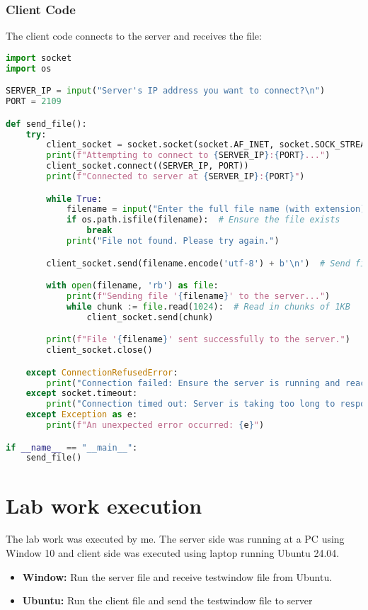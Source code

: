 \documentclass{article}
\begin{document}
\subsubsection{Client Code}
The client code connects to the server and receives the file:
\begin{lstlisting}[language=Python, caption=Client Code]
import socket
import os

SERVER_IP = input("Server's IP address you want to connect?\n")  
PORT = 2109 

def send_file():
    try:
        client_socket = socket.socket(socket.AF_INET, socket.SOCK_STREAM)
        print(f"Attempting to connect to {SERVER_IP}:{PORT}...")
        client_socket.connect((SERVER_IP, PORT))
        print(f"Connected to server at {SERVER_IP}:{PORT}")

        while True:
            filename = input("Enter the full file name (with extension): ")
            if os.path.isfile(filename):  # Ensure the file exists
                break
            print("File not found. Please try again.")

        client_socket.send(filename.encode('utf-8') + b'\n')  # Send filename with newline delimiter

        with open(filename, 'rb') as file:
            print(f"Sending file '{filename}' to the server...")
            while chunk := file.read(1024):  # Read in chunks of 1KB
                client_socket.send(chunk)

        print(f"File '{filename}' sent successfully to the server.")
        client_socket.close()

    except ConnectionRefusedError:
        print("Connection failed: Ensure the server is running and reachable.")
    except socket.timeout:
        print("Connection timed out: Server is taking too long to respond.")
    except Exception as e:
        print(f"An unexpected error occurred: {e}")

if __name__ == "__main__":
    send_file()


\end{lstlisting}

\section{Lab work execution}
The lab work was executed by me. The server side was running at a PC using Window 10 and client side was executed using laptop running Ubuntu 24.04.
\begin{itemize}
    \item \textbf{Window:} Run the server file and receive testwindow file from Ubuntu.
    \item \textbf{Ubuntu:} Run the client file and send the testwindow file to server 
\end{itemize}
\end{document}
